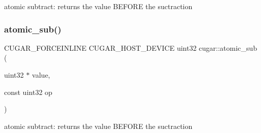 atomic subtract\+: returns the value B\+E\+F\+O\+RE the suctraction \mbox{\label{group___atomics_ga9d9415fae4e05362c8d6f43d2fd61c60}} 
\subsubsection{\texorpdfstring{atomic\+\_\+sub()}{atomic\_sub()}\hspace{0.1cm}{\footnotesize\ttfamily [2/2]}}
{\footnotesize\ttfamily C\+U\+G\+A\+R\+\_\+\+F\+O\+R\+C\+E\+I\+N\+L\+I\+NE C\+U\+G\+A\+R\+\_\+\+H\+O\+S\+T\+\_\+\+D\+E\+V\+I\+CE uint32 cugar\+::atomic\+\_\+sub (\begin{DoxyParamCaption}\item[{uint32 $\ast$}]{value,  }\item[{const uint32}]{op }\end{DoxyParamCaption})}

atomic subtract\+: returns the value B\+E\+F\+O\+RE the suctraction 